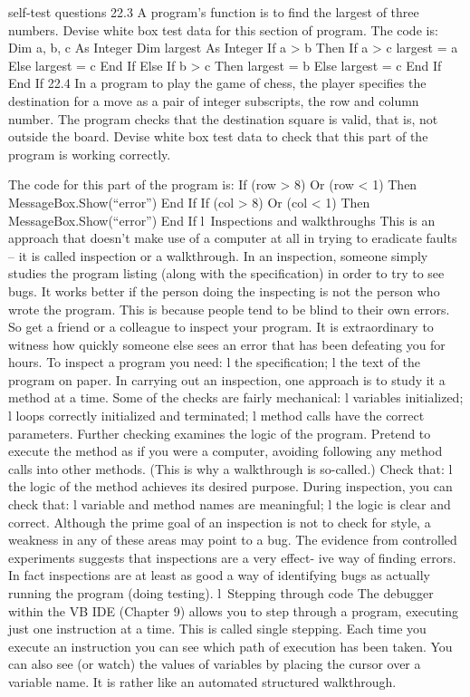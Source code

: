 self-test questions
22.3	A program’s function is to ﬁnd the largest of three numbers. Devise white box test data for this section of program.
The code is:
Dim a, b, c As Integer
Dim largest As Integer
If a > b Then
		If a > c
			largest = a
		Else
			largest = c
		End If
Else
		If b > c Then
			largest = b
		Else
			largest = c
		End If
End If
22.4	In a program to play the game of chess, the player speciﬁes the destination 
for a move as a pair of integer subscripts, the row and column number. The 
program checks that the destination square is valid, that is, not outside the board. Devise white box test data to check that this part of the program is working correctly.

The code for this part of the program is:
If (row > 8) Or (row < 1) Then
	MessageBox.Show(“error”)
End If
If (col > 8) Or (col < 1) Then
	MessageBox.Show(“error”)
End If
l Inspections and walkthroughs
This is an approach that doesn’t make use of a computer at all in trying to eradicate faults – it is called inspection or a walkthrough. In an inspection, someone simply studies the program listing (along with the speciﬁcation) in order to try to see bugs. It works better if the person doing the inspecting is not the person who wrote the program. This is because people tend to be blind to their own errors. So get a friend or a colleague to inspect your program. It is extraordinary to witness how quickly someone else sees an error that has been defeating you for hours.
To inspect a program you need:
l	the speciﬁcation;
l	the text of the program on paper.
In carrying out an inspection, one approach is to study it a method at a time. Some of the checks are fairly mechanical:
l	variables initialized;
l	loops correctly initialized and terminated;
l	method calls have the correct parameters.
Further checking examines the logic of the program. Pretend to execute the method as if you were a computer, avoiding following any method calls into other methods. (This is why a walkthrough is so-called.) Check that:
l	the logic of the method achieves its desired purpose.
During inspection, you can check that:
l	variable and method names are meaningful;
l	the logic is clear and correct.
Although the prime goal of an inspection is not to check for style, a weakness in any of these areas may point to a bug.
The evidence from controlled experiments suggests that inspections are a very effect-
ive way of ﬁnding errors. In fact inspections are at least as good a way of identifying bugs as actually running the program (doing testing).
l Stepping through code
The debugger within the VB IDE (Chapter 9) allows you to step through a program, executing just one instruction at a time. This is called single stepping. Each time you execute an instruction you can see which path of execution has been taken. You can also see (or watch) the values of variables by placing the cursor over a variable name. It is rather like an automated structured walkthrough.

